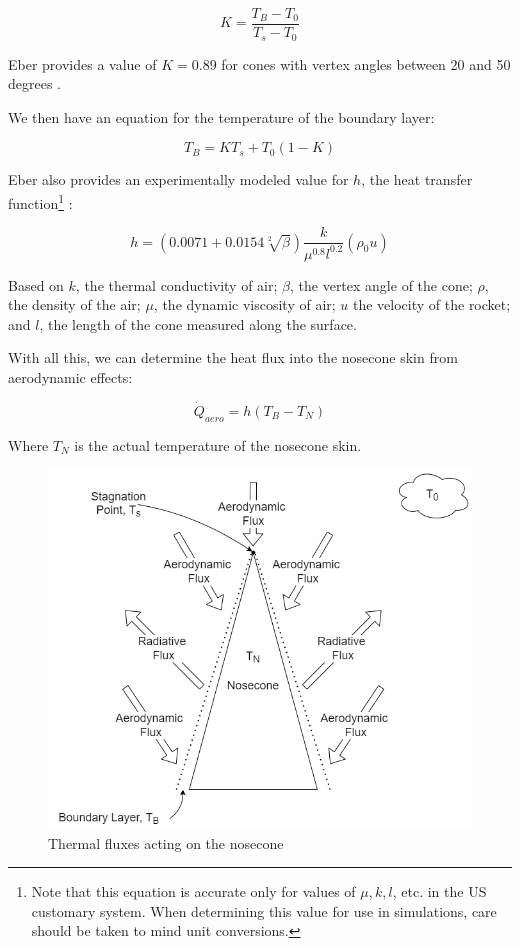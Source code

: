 \documentclass[twocolumn]{article}
\begin{document}
            \[K=\frac{T_B-T_0}{T_s-T_0}\]

            Eber provides a value of $K=0.89$ for cones with vertex
            angles between 20 and 50 degrees \cite{Eber:nazi}.

            We then have an equation for the temperature of the boundary layer:

            \[T_B=KT_s+T_0\left(1-K\right)\]

            Eber also provides an experimentally modeled value for $h$, the heat
            transfer function\footnote{Note that this equation is accurate only 
            for values of $\mu, k, l$, etc. in the US customary system. When determining this value for use in simulations,
            care should be taken to mind unit conversions.} \cite{Eber:nazi}:
            
            \[h=\left(0.0071+0.0154 \sqrt[2]{\beta}\right)\frac{k}{\mu^{0.8}l^{0.2}}\left(\rho_0 u\right)\]

            Based on $k$, the thermal conductivity of air; $\beta$, the vertex 
            angle of the cone; $\rho$, the density of the air; $\mu$, the dynamic
            viscosity of air; $u$ the velocity of the rocket; and $l$, the 
            length of the cone measured along the surface. 

            With all this, we can determine the heat flux into the nosecone skin
            from aerodynamic effects:

            \[
                \dot{Q}_{aero}= h(T_B-T_N)
            \]

            Where $T_N$ is the actual temperature of the nosecone skin.
            

            \begin{figure}
                \includegraphics[width=\linewidth]{nosecone.png}
                \caption{Thermal fluxes acting on the nosecone}
                \label{fig:nosecone}
            \end{figure}
\end{document}
